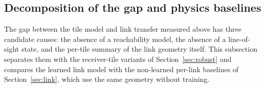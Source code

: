 \begin{table}[!tp]
\centering
\caption{Cell edges and dimensioning (mean over held-out cities). Disp.:
mean distance between true and predicted cell edges; length: relative error
of the number of cell-edge pixels. Plan: sites chosen greedily on the
predicted map until it covers \covTarget\% of the pixels at
\SI{140}{\decibel}, and the true coverage of those sites; truth: sites the
same procedure needs on the true map.}
\label{tab:mobility}
\footnotesize\setlength{\tabcolsep}{2.5pt}
%
\end{table}

\subsection{Decomposition of the gap and physics baselines}
\label{sec:res-decomp}

The gap between the tile model and link transfer measured above has three
candidate causes: the absence of a reachability model, the absence of a
line-of-sight state, and the per-tile summary of the link geometry itself.
This subsection separates them with the receiver-tile variants of
Section~\ref{sec:robust} and compares the learned link model with the
non-learned per-link baselines of Section~\ref{sec:link}, which use the
same geometry without training.

